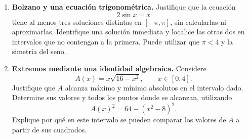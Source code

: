 \documentclass[10pt,a5paper]{article}
\begin{document}
\begin{enumerate}
  \item \textbf{Bolzano y una ecuación trigonométrica.} Justifique que la ecuación
  \[
    2\sin x=x
  \]
  tiene al menos tres soluciones distintas en $[-\pi,\pi]$, sin calcularlas ni aproximarlas. Identifique una solución inmediata y localice las otras dos en intervalos que no contengan a la primera. Puede utilizar que $\pi<4$ y la simetría del seno.
  \item \textbf{Extremos mediante una identidad algebraica.} Considere
  \[
    A(x)=x\sqrt{16-x^2},\qquad x\in[0,4].
  \]
  Justifique que $A$ alcanza máximo y mínimo absolutos en el intervalo dado. Determine sus valores y todos los puntos donde se alcanzan, utilizando
  \[
    A(x)^2=64-(x^2-8)^2.
  \]
  Explique por qué en este intervalo se pueden comparar los valores de $A$ a partir de sus cuadrados.
\end{enumerate}
\end{document}
